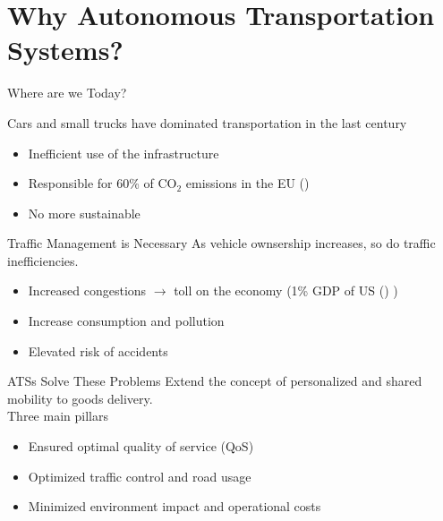 \section{Why Autonomous Transportation Systems?}
\begin{frame}{Where are we Today?}
	
	Cars and small trucks have dominated transportation in the last century
	\vspace{0.5cm}
	\begin{itemize}
	    \item Inefficient use of the infrastructure
	    \item Responsible for 60\% of $\text{CO}_2$ emissions in the EU (\cite{eea2023})
	    \item No more sustainable
	\end{itemize}
\end{frame}
\begin{frame}{Traffic Management is Necessary }
	As vehicle ownsership increases, so do traffic inefficiencies. 
	\vspace{0.5cm}
	\begin{itemize}
		\item Increased congestions $\rightarrow$ toll on the economy (1\% GDP of US (\cite{schrank2012}) )
		\item Increase consumption and pollution
		\item Elevated risk of accidents
	\end{itemize}
\end{frame}

\begin{frame}{ATSs Solve These Problems }
	Extend the concept of personalized and shared mobility to goods delivery.\\
	Three main pillars 
	\vspace{0.3cm}
	\begin{itemize}
		\item Ensured optimal quality of service (QoS)
		\item Optimized traffic control and road usage
		\item Minimized environment impact and operational costs
	\end{itemize}
\end{frame}